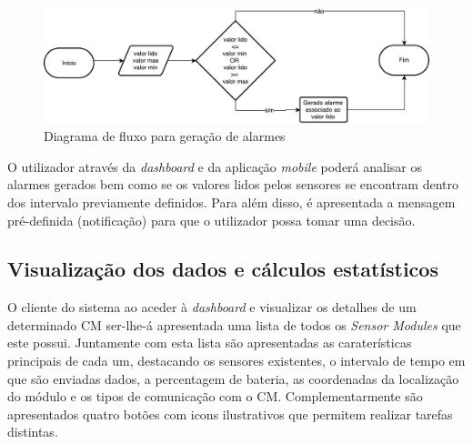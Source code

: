 \begin{figure}[!htb]
	\centering
	\includegraphics[scale=0.5]{esquemas/diagramafluxoalarms.pdf}
	\caption{Diagrama de fluxo para geração de alarmes}
	\label{fluxoSP}
\end{figure}





O utilizador através da \textit{dashboard} e da aplicação \textit{mobile} poderá analisar os alarmes gerados bem como se os valores lidos pelos sensores se encontram dentro dos intervalo previamente definidos. Para além disso, é apresentada a mensagem pré-definida (notificação) para que o utilizador possa tomar uma decisão.   



\newpage
\subsection{Visualização dos dados e cálculos estatísticos}

O cliente do sistema ao aceder à \textit{dashboard} e visualizar os detalhes de um determinado \acl{CM} ser-lhe-á apresentada uma lista de todos os \textit{Sensor Modules} que este possui. Juntamente com esta lista são apresentadas as caraterísticas principais de cada um, destacando os sensores existentes, o intervalo de tempo em que são enviadas dados, a percentagem de bateria, as coordenadas da localização do módulo e os tipos de comunicação com o \acl{CM}. Complementarmente são apresentados quatro botões com icons ilustrativos que permitem realizar tarefas distintas.  

